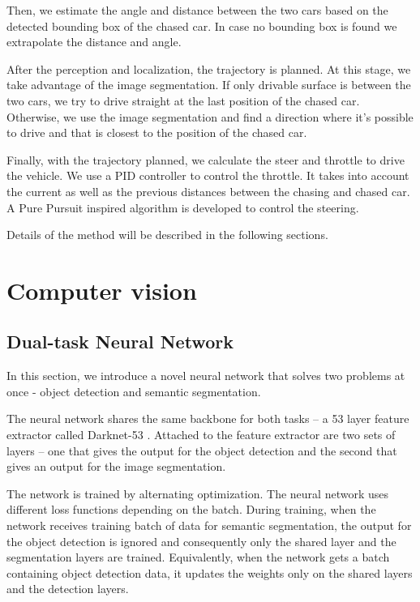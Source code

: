Then, we estimate the angle and distance between the two cars based on the detected bounding box of the chased car. In case no bounding box is found we extrapolate the distance and angle. \par


After the perception and localization, the trajectory is planned. At this stage, we take advantage of the image segmentation. If only drivable surface is between the two cars, we try to drive straight at the last position of the chased car. Otherwise, we use the image segmentation and find a direction where it's possible to drive and that is closest to the position of the chased car. \par


Finally, with the trajectory planned, we calculate the steer and throttle to drive the vehicle. We use a PID controller \cite{PID_orig} to control the throttle. It takes into account the current as well as the previous distances between the chasing and chased car. A Pure Pursuit \cite{pure_pursuit_orig} inspired algorithm is developed to control the steering. \par

Details of the method will be described in the following sections.




\section{Computer vision}
\subsection{Dual-task Neural Network}
In this section, we introduce a novel neural network that solves two problems at once - object detection and semantic segmentation. \par


The neural network shares the same backbone for both tasks -- a 53 layer feature extractor called Darknet-53 \cite{YOLOv3}. Attached to the feature extractor are two sets of layers -- one that gives the output for the object detection and the second that gives an output for the image segmentation. \par


The network is trained by alternating optimization. The neural network uses different loss functions depending on the batch. During training, when the network receives training batch of data for semantic segmentation, the output for the object detection is ignored and consequently only the shared layer and the segmentation layers are trained. Equivalently, when the network gets a batch containing object detection data, it updates the weights only on the shared layers and the detection layers. \par


